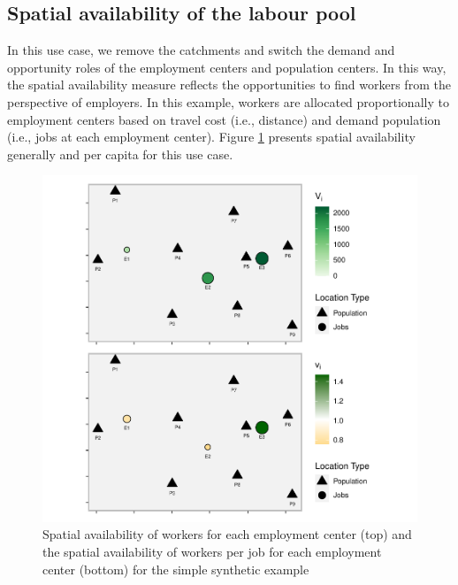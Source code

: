 \documentclass[]{elsarticle} %
\begin{document}
\hypertarget{spatial-availability-of-the-labour-pool}{%
\subsection{Spatial availability of the labour
pool}\label{spatial-availability-of-the-labour-pool}}

In this use case, we remove the catchments and switch the demand and
opportunity roles of the employment centers and population centers. In
this way, the spatial availability measure reflects the opportunities to
find workers from the perspective of employers. In this example, workers
are allocated proportionally to employment centers based on travel cost
(i.e., distance) and demand population (i.e., jobs at each employment
center). Figure \ref{fig:toy-example-availability-workers-per-job}
presents spatial availability generally and per capita for this use
case.

\begin{figure}
\includegraphics[width=1\linewidth]{Spatial-Availability_files/figure-latex/toy-example-availability-workers-per-job-1} \caption{\label{fig:toy-example-availability-workers-per-job} Spatial availability of workers for each employment center (top) and the spatial availability of workers per job for each employment center (bottom) for the simple synthetic example}\label{fig:toy-example-availability-workers-per-job}
\end{figure}
\end{document}
